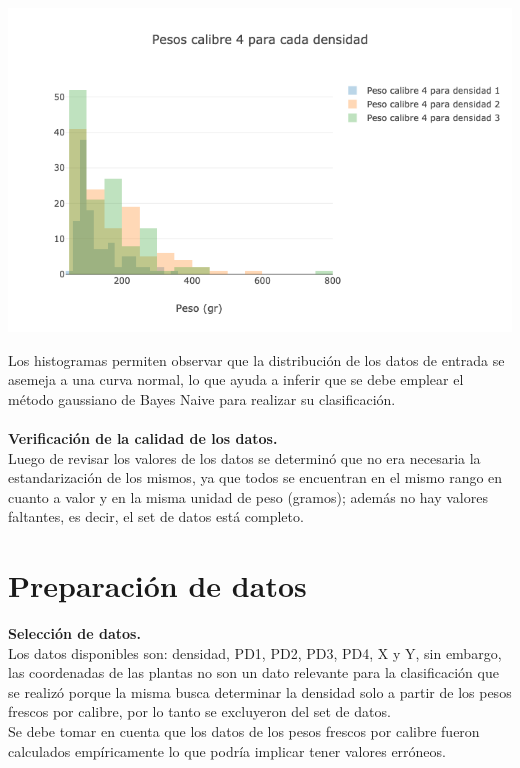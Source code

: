 \begin{center}
\includegraphics[scale=0.6]{PD4.png}
\end{center}

Los histogramas permiten observar que la distribución de los datos de entrada se asemeja a
una curva normal, lo que ayuda a inferir que se debe emplear el método gaussiano de
Bayes Naive para realizar su clasificación.\\\\

\noindent
\textbf{Verificación de la calidad de los datos.}\\

Luego de revisar los valores de los datos se determinó que no era necesaria la estandarización de los mismos, ya que todos se encuentran en el mismo rango en cuanto a valor y en la misma unidad de peso (gramos); además no hay valores faltantes, es decir, el set de datos está completo.

\section{Preparación de datos}

\noindent
\textbf{Selección de datos.}\\

Los datos disponibles son: densidad, PD1, PD2, PD3, PD4, X y Y, sin embargo, las coordenadas de las
plantas no son un dato relevante para la clasificación que se realizó porque la misma busca determinar
la densidad solo a partir de los pesos frescos por calibre, por lo tanto se excluyeron del set de datos.\\

Se debe tomar en cuenta que los datos de los pesos frescos por calibre fueron calculados empíricamente
lo que podría implicar tener valores erróneos.\\

